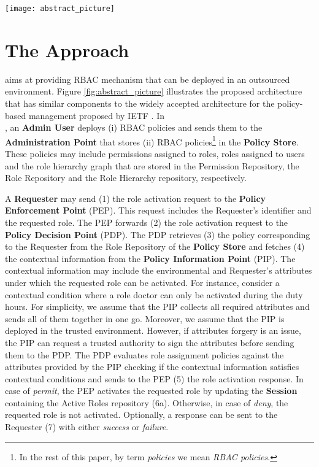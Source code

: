 \documentclass[final,5p,times,twocolumn]{elsarticle}
\begin{document}
\begin{figure*} [htp]
\centering
\texttt{[image: abstract\_picture]}
\caption{The  architecture for enforcing RBAC policies in outsourced environments}
\label{fig:abstract_picture}
\end{figure*}

\section{The  Approach}
\label{sec:approach}

 aims at providing RBAC mechanism that can be deployed in an outsourced environment. Figure \ref{fig:abstract_picture} illustrates the proposed architecture that has similar components to the widely accepted architecture for the policy-based management proposed by IETF \cite{Yavatkar2000}. In \\ , an \textbf{Admin User} deploys (i) RBAC policies and sends them to the \textbf{Administration Point} that stores (ii) RBAC policies\footnote{In the rest of this paper, by term \emph{policies} we mean \emph{RBAC policies}.} in the \textbf{Policy Store}. These policies may include permissions assigned to roles, roles assigned to users and the role hierarchy graph that are stored in the Permission Repository, the Role Repository and the Role Hierarchy repository, respectively. 

A \textbf{Requester} may send (1) the role activation request to the \textbf{Policy Enforcement Point} (PEP). This request includes the Requester's identifier and the requested role. The PEP forwards (2) the role activation request to the \textbf{Policy Decision Point} (PDP). The PDP retrieves (3) the policy corresponding to the Requester from the Role Repository of the \textbf{Policy Store} and fetches (4) the contextual information from the \textbf{Policy Information Point} (PIP). The contextual information may include the environmental and Requester's attributes under which the requested role can be activated. For instance, consider a contextual condition where a role doctor can only be activated during the duty hours. For simplicity, we assume that the PIP collects all required attributes and sends all of them together in one go. Moreover, we assume that the PIP is deployed in the trusted environment. However, if attributes forgery is an issue, the PIP can request a trusted authority to sign the attributes before sending them to the PDP. The PDP evaluates role assignment policies against the attributes provided by the PIP checking if the contextual information satisfies contextual conditions and sends to the PEP (5) the role activation response. In case of \emph{permit}, the PEP activates the requested role by updating the \textbf{Session} containing the Active Roles repository (6a). Otherwise, in case of \emph{deny}, the requested role is not activated. Optionally, a response can be sent to the Requester (7) with either \emph{success} or \emph{failure}.
\end{document}
